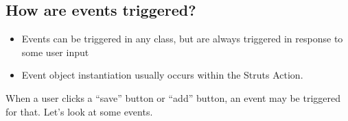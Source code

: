 \begin{ifhtml}
\begin{s5slide}
\begin{s5notes}
        \end{s5notes} 
    \end{s5slide}

    \begin{s5slide}
        \section{How are events triggered?}
        \begin{itemize}
          \item Events can be triggered in any class, but are always triggered in response to some user input
          \item Event object instantiation usually occurs within the Struts Action.
        \end{itemize}
        
        \begin{s5notes}
          When a user clicks a ``save'' button or ``add'' button, an event may be triggered for that. Let's look at some events.
        \end{s5notes} 
    \end{s5slide}
\end{ifhtml}